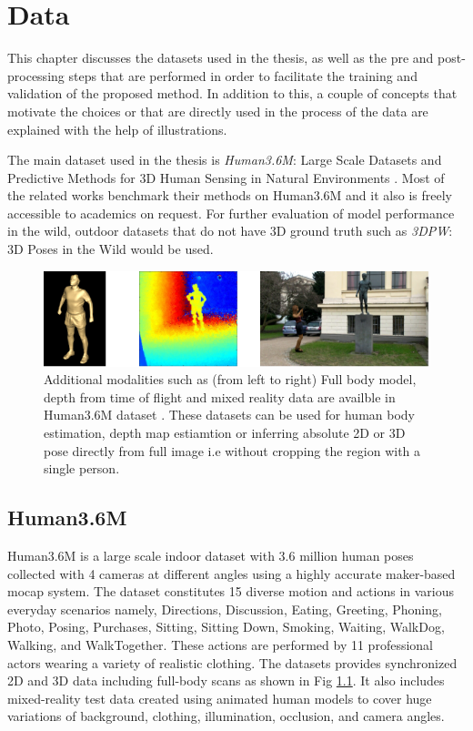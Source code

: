 \chapter{Data}
\label{chap:data}

This chapter discusses the datasets used in the thesis, as well as the pre and post-processing steps that are performed in order to facilitate the training and validation of the proposed method. In addition to this, a couple of concepts that motivate the choices or that are directly used in the process of the data are explained with the help of illustrations. 

The main dataset used in the thesis is \textit{Human3.6M}: Large Scale Datasets and Predictive Methods for 3D Human Sensing in Natural Environments \cite{H3.6}. Most of the related works benchmark their methods on Human3.6M and it also is freely accessible to academics on request. For further evaluation of model performance in the wild, outdoor datasets that do not have 3D ground truth such as \textit{3DPW}: 3D Poses in the Wild \cite{3dpw} would be used.

\begin{figure}[h]
    \centering
    \includegraphics[width=\textwidth]{figures/h36/modlities.png}
    \caption{Additional modalities such as (from left to right) Full body model, depth from time of flight and mixed reality data are availble in Human3.6M dataset \cite{H3.6}. These datasets can be used for human body estimation, depth map estiamtion or inferring absolute 2D or 3D pose directly from full image i.e without cropping the region with a single person.}
    \label{fig:h36_modality}
\end{figure}

\section{Human3.6M}
\label{sec:h36m}
Human3.6M is a large scale indoor dataset with 3.6 million human poses collected with 4 cameras at different angles using a highly accurate maker-based \ac{mocap} system. The dataset constitutes 15 diverse motion and actions in various everyday scenarios namely, Directions, Discussion, Eating, Greeting, Phoning, Photo, Posing, Purchases, Sitting, Sitting Down, Smoking, Waiting, WalkDog, Walking, and WalkTogether. These actions are performed by 11 professional actors wearing a variety of realistic clothing. The datasets provides synchronized 2D and 3D data including full-body scans as shown in Fig \ref{fig:h36_modality}. It also includes mixed-reality test data created using animated human models to cover huge variations of background, clothing, illumination, occlusion, and camera angles.

